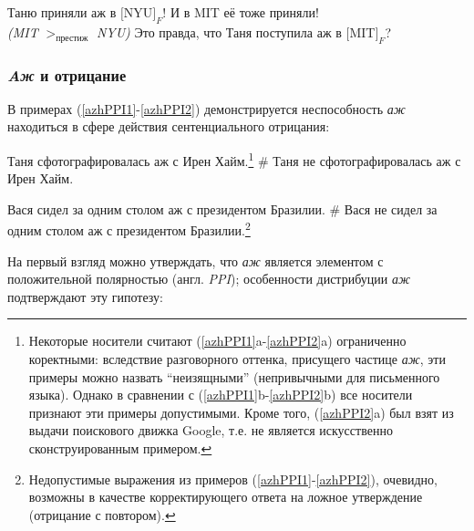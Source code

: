 \documentclass[a4paper, titlepage]{article}
\begin{document}
\begin{exe}
    \ex \begin{xlist}
        \ex Таню приняли аж в $[$\textsc{NYU}$]_F$! И в MIT её тоже приняли!\\
        \textit{(MIT} $ >_{\text{престиж}} $ \textit{NYU)}
        \ex Это правда, что Таня поступила аж в $[$\textsc{MIT}$]_F$?
    \end{xlist}
\end{exe}

\subsubsection{\textit{Aж} и отрицание}

В примерах (\ref{azhPPI1}-\ref{azhPPI2}) демонстрируется неспособность \textit{аж} находиться в сфере действия сентенциального отрицания:

\begin{exe}
    \ex \label{azhPPI1} \begin{xlist}
        \ex Таня сфотографировалась аж с Ирен Хайм.\footnote{Некоторые носители считают (\ref{azhPPI1}a-\ref{azhPPI2}a) ограниченно коректными: вследствие разговорного оттенка, присущего частице \textit{аж}, эти примеры можно назвать ``неизящными'' (непривычными для письменного языка). Однако в сравнении с (\ref{azhPPI1}b-\ref{azhPPI2}b) все носители признают эти примеры допустимыми. Кроме того, (\ref{azhPPI2}a) был взят из выдачи поискового движка Google, т.е. не является искусственно сконструированным примером.}
        \ex \# Таня не сфотографировалась аж с Ирен Хайм.
    \end{xlist}
\end{exe}

\begin{exe}
    \ex \label{azhPPI2} \begin{xlist}
        \ex Вася сидел за одним столом аж с президентом Бразилии.
        \ex \# Вася не сидел за одним столом аж с президентом Бразилии.\footnote{Недопустимые выражения из примеров (\ref{azhPPI1}-\ref{azhPPI2}), очевидно, возможны в качестве корректирующего ответа на ложное утверждение (отрицание с повтором).}
    \end{xlist}
\end{exe}

\medskip

На первый взгляд можно утверждать, что \textit{аж} является элементом с положительной полярностью (англ. \textit{PPI}); особенности дистрибуции \textit{аж} подтверждают эту гипотезу:
\end{document}
